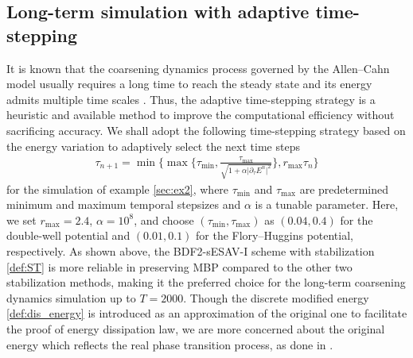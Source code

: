 \documentclass{m2an}
\newcommand{\f}{\frac}
\newcommand{\p}{\partial}
\begin{document}
\subsection{Long-term simulation with adaptive  time-stepping}\label{sec:ex3}
It is known that the coarsening dynamics process governed by the Allen--Cahn model usually requires a long time to reach the steady state  and its energy admits multiple time scales \cite{MOC_2023_Ju,SINUM_2020_Liao,SINUM_Ju_2022}. Thus, the adaptive time-stepping strategy is a heuristic and available method to improve the computational efficiency without sacrificing accuracy. We shall adopt the following time-stepping strategy \cite{JSC_Zhang_2022,SISC_2011_Qiao} based on the energy variation to adaptively select the next time steps
\begin{equation}\label{ex:adaptive}
	\begin{aligned}
			\tau_{n+1} = \min\bigg\{ \max \bigg\{ \tau_{\min} , \f{\tau_{\max}}{ \sqrt{ 1 + \alpha \vert \p_{\tau} E^{n} \vert^{2} } } \bigg\}, r_{\max} \tau_{n} \bigg\}
		\end{aligned}
\end{equation}
for the simulation of example \ref{sec:ex2},
where $ \tau_{\min} $ and $ \tau_{\max} $ are predetermined minimum and maximum temporal stepsizes and $ \alpha $ is a tunable parameter. Here, we set $ r_{\max} = 2.4 $, $ \alpha = 10^{8} $, and choose $ ( \tau_{\min}, \tau_{\max} ) $ as $ ( 0.04, 0.4 ) $ for the double-well potential and $ (0.01, 0.1) $ for the Flory--Huggins potential, respectively. As shown above, the BDF2-sESAV-I scheme with stabilization \eqref{def:ST} is more reliable in preserving MBP compared to the other two stabilization methods, making it the preferred choice for the long-term coarsening dynamics simulation up to $ T = 2000 $.
Though the discrete modified energy \eqref{def:dis_energy} is introduced as an approximation of the original one to facilitate the proof of energy dissipation law, we are more concerned about the original energy which reflects the real phase transition process, as done in \cite{SINUM_Ju_2022,JSC_Ju_2022}.
\end{document}
